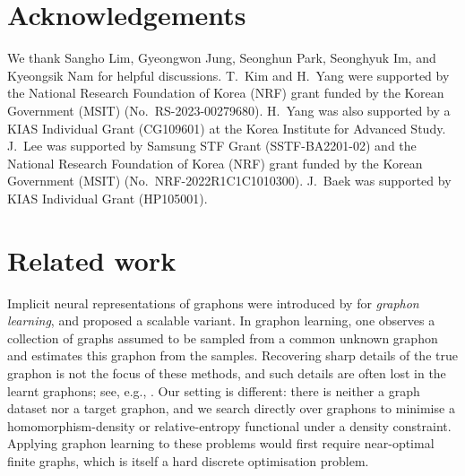 \documentclass[11pt]{article}
\theoremstyle{plain}
\theoremstyle{definition}
\theoremstyle{remark}
\newenvironment{ack}{\section*{Acknowledgements}}{}
\begin{document}
\begin{ack}
We thank Sangho Lim, Gyeongwon Jung, Seonghun Park, Seonghyuk Im, and Kyeongsik Nam for helpful discussions.
T.~Kim and H.~Yang were supported by the National Research Foundation of Korea (NRF) grant funded by the Korean Government (MSIT) (No.~RS-2023-00279680). H.~Yang was also supported by a KIAS Individual Grant (CG109601) at the Korea Institute for Advanced Study. J.~Lee was supported by Samsung STF Grant (SSTF-BA2201-02) and the National Research Foundation of Korea (NRF) grant funded by the Korean Government (MSIT) (No.~NRF-2022R1C1C1010300).
J.~Baek was supported by KIAS Individual Grant (HP105001).
\end{ack}




\appendix

\newpage

\allowdisplaybreaks[0]

\section{Related work}

Implicit neural representations of graphons were introduced by \citet{xia2023implicit} for \emph{graphon learning}, and \citet{azizpour2025scalable} proposed a scalable variant. In graphon learning, one observes a collection of graphs assumed to be sampled from a common unknown graphon and estimates this graphon from the samples. Recovering sharp details of the true graphon is not the focus of these methods, and such details are often lost in the learnt graphons; see, e.g., \citet[Figs.~3(b) and~9]{azizpour2025scalable}. Our setting is different: there is neither a graph dataset nor a target graphon, and we search directly over graphons to minimise a homomorphism-density or relative-entropy functional under a density constraint. Applying graphon learning to these problems would first require near-optimal finite graphs, which is itself a hard discrete optimisation problem.
\end{document}
